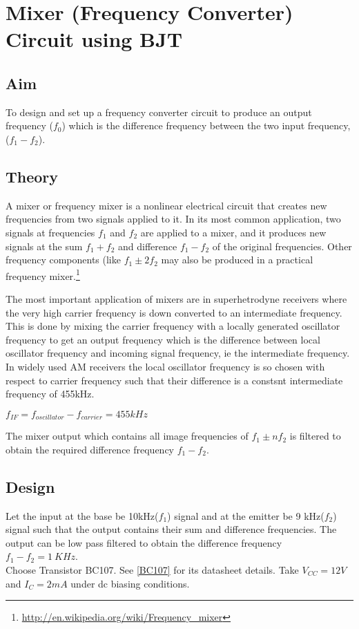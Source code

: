 \chapter[Mixer Circuit using BJT]{Mixer (Frequency Converter) Circuit using BJT}
\section*{Aim}
To design and set up a frequency converter circuit to produce an output frequency ($f_0$) which is the difference frequency between the two input frequency, ($f_{1}-f_{2}$).
\section*{Theory}
A mixer or frequency mixer is a nonlinear electrical circuit that creates new frequencies from two signals applied to it. In its most common application, two signals at frequencies $f_1$ and $f_2$ are applied to a mixer, and it produces new signals at the sum $f_1 + f_2$ and difference $f_1 - f_2$ of the original frequencies. Other frequency components (like $f_1 \pm 2f_2$ may also be produced in a practical frequency mixer.\footnote{\url{http://en.wikipedia.org/wiki/Frequency_mixer}}

The most important application of mixers are in superhetrodyne receivers where the very high carrier frequency is down converted to an intermediate frequency. This is done by mixing the carrier frequency with a locally generated oscillator frequency to get an output frequency which is the difference between local oscillator frequency and incoming signal frequency, ie the intermediate frequency. In widely used AM receivers the local oscillator frequency is so chosen with respect to carrier frequency such that their difference is a constsnt intermediate frequency of 455kHz.\\
\begin{center}
$f_{IF}=f_{oscillator}-f_{carrier}=455 kHz$
\end{center}
The mixer output which contains all image frequencies of $f_1 \pm nf_2$ is filtered to obtain the required difference frequency $f_1-f_2$.
\section*{Design}
Let the input at the base be 10kHz($f_1$) signal and at the emitter be 9 kHz($f_2$) signal such that the output contains their sum and difference frequencies. The output can be low pass filtered to obtain the difference frequency $f_1-f_2=1 \ KHz$.
\\ Choose Transistor BC107. See \ref{BC107} for its datasheet details. 
\noindent Take $V_{CC}=12 V$ and $I_C=2 mA$ under dc biasing conditions.

